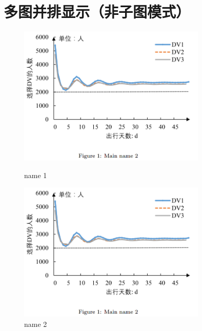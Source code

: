 \documentclass[
	draftmark = false,   %
	fontsetup = font-setup-open.tex,
	titlesetup = titles-setup.tex
]{AJbook}
\numberwithin{equation}{section}
\begin{document}
	\section{多图并排显示（非子图模式）}
	\begin{figure}[H]
	\centering %
	\begin{minipage}[b]{0.45\textwidth} %
	\centering %
	\includegraphics[width=0.8\textwidth]{./imgs/figure-1.png} %
	\caption{name 1}
	\label{Fig.1}
	\end{minipage}
	\begin{minipage}[b]{0.45\textwidth} %
	\centering %
	\includegraphics[width=0.8\textwidth]{./imgs/figure-1.png}%
	\caption{name 2}
	\label{Fig.2}
	\end{minipage}
	\end{figure}
\end{document}
